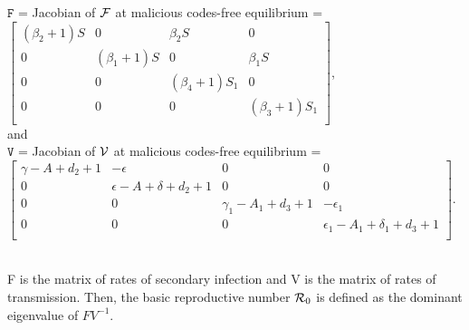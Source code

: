 \documentclass[12pt]{article}
\begin{document}
$\mathbf{\mathtt{F}}$ = Jacobian of $\cal{F}$ at malicious codes-free equilibrium = $\left[
                         \begin{array}{cccc}
                         (\beta _{2}+1){S} & 0 & \beta_{2}{S} & 0 \\
                          0 & (\beta _{1}+1){S} & 0 & \beta_{1}{S} \\
                          0 & 0 & (\beta_{4}+1) S_{1} & 0 \\
                          0 & 0 & 0 & (\beta_{3}+1) S_{1} \\
                         \end{array} \right] $, \\
                         and\\
$\mathbf{\mathtt{V}}$ = Jacobian of $\cal{V}$ at malicious codes-free equilibrium = $\left[
                                                                           \begin{array}{cccc}
                                                                           \gamma-A+d_{2}+1 & -\epsilon & 0 & 0 \\
                                                                            0 & \epsilon-A+\delta+d_{2}+1   & 0 & 0 \\
                                                                            0 & 0 &  \gamma_{1}-A_{1}+d_{3}+1 & -\epsilon_{1}\\
                                                                            0 & 0 & 0 & \epsilon_{1}-A_{1}+\delta_{1}+d_{3}+1 \\
                                                                           \end{array}
                                                                         \right].$

\\F is the matrix of rates of secondary infection and V is the matrix of rates of transmission. Then, the basic reproductive number ${{\cal R}}_{0}$ is defined as the dominant eigenvalue of $FV^{-1}$.\\
\end{document}
